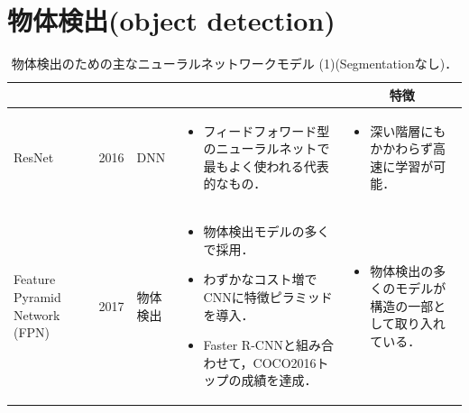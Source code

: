 \documentclass[twocolumn]{jsarticle} %
\begin{document}
\section{物体検出(object detection)}
\begin{table}
    \caption{物体検出のための主なニューラルネットワークモデル (1)(Segmentationなし)．}
    \label{tbl-cheat1}
    \begin{center}
        \setlength{\tabcolsep}{3pt}
        \footnotesize
        \begin{tabularx}{\linewidth}{XcXp{7cm}X} \toprule
            \centering{モデル名称[文献]} & \centering{発行年} & \centering{用途} & \centering{概要} & \multicolumn{1}{c}{特徴} \\ \midrule

            ResNet \cite{HZRS16} & 2016 & DNN & 
            \begin{itemize}
                \vspace{-0.7\baselineskip}
                \setlength{\leftskip}{-3mm}
                \item フィードフォワード型のニューラルネットで最もよく使われる代表的なもの．
            \end{itemize}
            &
            \begin{itemize}
                \vspace{-0.7\baselineskip}
                \setlength{\leftskip}{-3mm}
                \item  深い階層にもかかわらず高速に学習が可能．
            \end{itemize}
            \\
        
            Feature Pyramid Network (FPN) \cite{LDGHHB17} & 2017 & 物体検出 & 
            \begin{itemize}
                \vspace{-0.7\baselineskip}
                \setlength{\leftskip}{-3mm}
                \item 物体検出モデルの多くで採用．
                \item わずかなコスト増でCNNに特徴ピラミッドを導入．
                \item Faster R-CNNと組み合わせて，COCO2016トップの成績を達成． 
            \end{itemize}
            &
            \begin{itemize}
                \vspace{-0.7\baselineskip}
                \setlength{\leftskip}{-3mm}
                \item 物体検出の多くのモデルが構造の一部として取り入れている．
            \end{itemize}
            \\


\end{tabularx}
\end{center}
\end{table}
\end{document}
